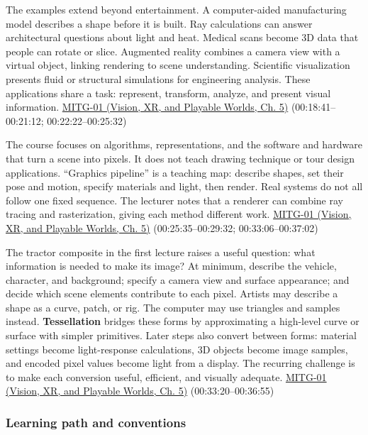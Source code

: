 The examples extend beyond entertainment. A computer-aided manufacturing model describes a shape before it is built. Ray calculations can answer architectural questions about light and heat. Medical scans become 3D data that people can rotate or slice. Augmented reality combines a camera view with a virtual object, linking rendering to scene understanding. Scientific visualization presents fluid or structural simulations for engineering analysis. These applications share a task: represent, transform, analyze, and present visual information. \href{../07-Vision-XR-and-Playable-Worlds/main.pdf\#nameddest=04-visual-computing-ii-ch036-mitg-01---introduction}{MITG-01 (Vision, XR, and Playable Worlds, Ch. 5)} (00:18:41--00:21:12; 00:22:22--00:25:32)

The course focuses on algorithms, representations, and the software and hardware that turn a scene into pixels. It does not teach drawing technique or tour design applications. ``Graphics pipeline'' is a teaching map: describe shapes, set their pose and motion, specify materials and light, then render. Real systems do not all follow one fixed sequence. The lecturer notes that a renderer can combine ray tracing and rasterization, giving each method different work. \href{../07-Vision-XR-and-Playable-Worlds/main.pdf\#nameddest=04-visual-computing-ii-ch036-mitg-01---introduction}{MITG-01 (Vision, XR, and Playable Worlds, Ch. 5)} (00:25:35--00:29:32; 00:33:06--00:37:02)

The tractor composite in the first lecture raises a useful question: what information is needed to make its image? At minimum, describe the vehicle, character, and background; specify a camera view and surface appearance; and decide which scene elements contribute to each pixel. Artists may describe a shape as a curve, patch, or rig. The computer may use triangles and samples instead. \textbf{Tessellation} bridges these forms by approximating a high-level curve or surface with simpler primitives. Later steps also convert between forms: material settings become light-response calculations, 3D objects become image samples, and encoded pixel values become light from a display. The recurring challenge is to make each conversion useful, efficient, and visually adequate. \href{../07-Vision-XR-and-Playable-Worlds/main.pdf\#nameddest=04-visual-computing-ii-ch036-mitg-01---introduction}{MITG-01 (Vision, XR, and Playable Worlds, Ch. 5)} (00:33:20--00:36:55)

\subsubsection{Learning path and conventions}\label{03-visual-computing-i-ch001-learning-path-and-conventions}

